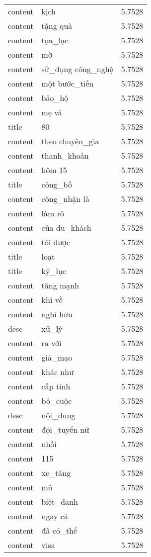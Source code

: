 \documentclass{article}
\begin{document}
\begin{tabular}{lll}
content & kịch & 5.7528\\
content & tặng quà & 5.7528\\
content & tọa\_lạc & 5.7528\\
content & mờ & 5.7528\\
content & sử\_dụng công\_nghệ & 5.7528\\
content & một bước\_tiến & 5.7528\\
content & bảo\_hộ & 5.7528\\
content & mẹ và & 5.7528\\
title & 80 & 5.7528\\
content & theo chuyên\_gia & 5.7528\\
content & thanh\_khoản & 5.7528\\
content & hôm 15 & 5.7528\\
title & công\_bố & 5.7528\\
content & công\_nhận là & 5.7528\\
content & làm rõ & 5.7528\\
content & của du\_khách & 5.7528\\
content & tôi được & 5.7528\\
title & loạt & 5.7528\\
title & kỷ\_lục & 5.7528\\
content & tăng mạnh & 5.7528\\
content & khi về & 5.7528\\
content & nghỉ hưu & 5.7528\\
desc & xử\_lý & 5.7528\\
content & ra với & 5.7528\\
content & giả\_mạo & 5.7528\\
content & khác như & 5.7528\\
content & cấp tỉnh & 5.7528\\
content & bỏ\_cuộc & 5.7528\\
desc & nội\_dung & 5.7528\\
content & đội\_tuyển nữ & 5.7528\\
content & nhồi & 5.7528\\
content & 115 & 5.7528\\
content & xe\_tăng & 5.7528\\
content & mũ & 5.7528\\
content & biệt\_danh & 5.7528\\
content & ngay cả & 5.7528\\
content & đã có\_thể & 5.7528\\
content & visa & 5.7528\\

\end{tabular}
\end{document}
